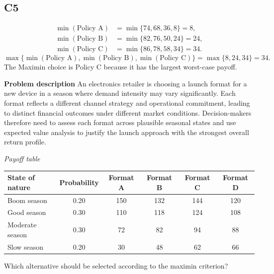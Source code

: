 \begin{ExamProblems}
		\subsection*{C5}
			\[
			\begin{aligned}
			\min(\text{Policy A}) &= \min\{74,68,36,8\} = 8,\\
			\min(\text{Policy B}) &= \min\{82,76,50,24\} = 24,\\
			\min(\text{Policy C}) &= \min\{86,78,58,34\} = 34.
			\end{aligned}
			\]
			\[
			\max\{\min(\text{Policy A}), \min(\text{Policy B}), \min(\text{Policy C})\}
			= \max\{8, 24, 34\}
			= 34.
			\]
			The Maximin choice is Policy C because it has the largest worst-case payoff.
		\item
		\textbf{Problem description}
		An electronics retailer is choosing a launch format for a new device in a season where demand intensity may vary significantly. Each format reflects a different channel strategy and operational commitment, leading to distinct financial outcomes under different market conditions. Decision-makers therefore need to assess each format across plausible seasonal states and use expected value analysis to justify the launch approach with the strongest overall return profile.

		\begin{center}
			\textit{Payoff table} \par
			\begin{tabular}{l c c c c c}
				\toprule
				State of nature & Probability & Format A & Format B & Format C & Format D \\
				\midrule
				Boom season & 0.20 & 150 & 132 & 144 & 120 \\
				Good season & 0.30 & 110 & 118 & 124 & 108 \\
				Moderate season & 0.30 & 72 & 82 & 94 & 88 \\
				Slow season & 0.20 & 30 & 48 & 62 & 66 \\
				\bottomrule
			\end{tabular}
		\end{center}

		Which alternative should be selected according to the maximin criterion?


\end{ExamProblems}
